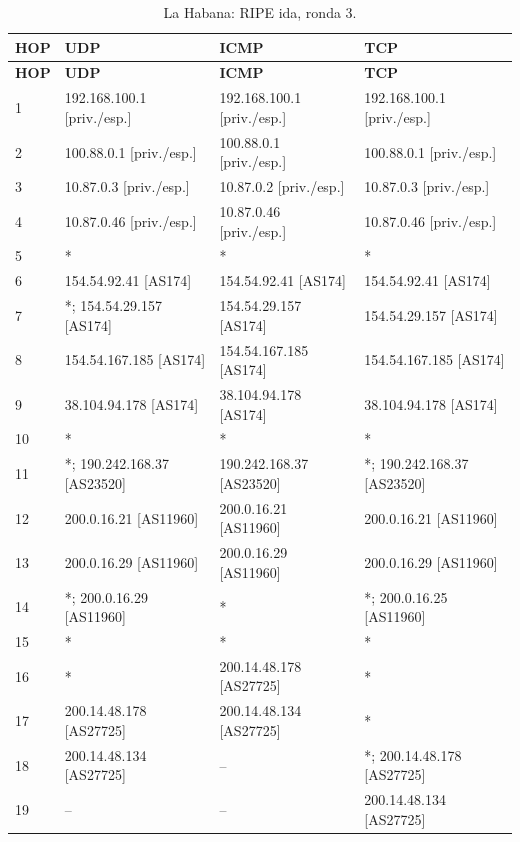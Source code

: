 \begingroup
\fontsize{9}{11}\selectfont
\begin{longtable}{p{0.95cm}p{4.716666666666667cm}p{4.716666666666667cm}p{4.716666666666667cm}}
\caption{La Habana: RIPE ida, ronda 3.}\label{anexo:ripe:200.14.48.134:3} \\
\toprule
\textbf{HOP} & \textbf{UDP} & \textbf{ICMP} & \textbf{TCP} \\ \midrule
\endfirsthead
\toprule
\textbf{HOP} & \textbf{UDP} & \textbf{ICMP} & \textbf{TCP} \\ \midrule
\endhead
1 & 192.168.100.1 [priv./esp.] & 192.168.100.1 [priv./esp.] & 192.168.100.1 [priv./esp.] \\
2 & 100.88.0.1 [priv./esp.] & 100.88.0.1 [priv./esp.] & 100.88.0.1 [priv./esp.] \\
3 & 10.87.0.3 [priv./esp.] & 10.87.0.2 [priv./esp.] & 10.87.0.3 [priv./esp.] \\
4 & 10.87.0.46 [priv./esp.] & 10.87.0.46 [priv./esp.] & 10.87.0.46 [priv./esp.] \\
5 & * & * & * \\
6 & 154.54.92.41 [AS174] & 154.54.92.41 [AS174] & 154.54.92.41 [AS174] \\
7 & *; 154.54.29.157 [AS174] & 154.54.29.157 [AS174] & 154.54.29.157 [AS174] \\
8 & 154.54.167.185 [AS174] & 154.54.167.185 [AS174] & 154.54.167.185 [AS174] \\
9 & 38.104.94.178 [AS174] & 38.104.94.178 [AS174] & 38.104.94.178 [AS174] \\
10 & * & * & * \\
11 & *; 190.242.168.37 [AS23520] & 190.242.168.37 [AS23520] & *; 190.242.168.37 [AS23520] \\
12 & 200.0.16.21 [AS11960] & 200.0.16.21 [AS11960] & 200.0.16.21 [AS11960] \\
13 & 200.0.16.29 [AS11960] & 200.0.16.29 [AS11960] & 200.0.16.29 [AS11960] \\
14 & *; 200.0.16.29 [AS11960] & * & *; 200.0.16.25 [AS11960] \\
15 & * & * & * \\
16 & * & 200.14.48.178 [AS27725] & * \\
17 & 200.14.48.178 [AS27725] & 200.14.48.134 [AS27725] & * \\
18 & 200.14.48.134 [AS27725] & -- & *; 200.14.48.178 [AS27725] \\
19 & -- & -- & 200.14.48.134 [AS27725] \\
\bottomrule
\end{longtable}
